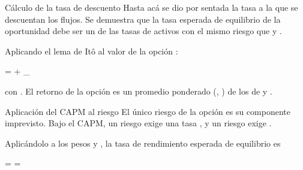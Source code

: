 \begin{frame}{Cálculo de la tasa de descuento}
  Hasta acá se dio por sentada la tasa \az{$\mu$} a la que se descuentan los
  flujos. Se demuestra que la tasa esperada de equilibrio de la oportunidad
  debe ser un  de las tasas de activos con el
  mismo riesgo que  y .
  \par\vspace{2mm}
  Aplicando el lema de Itô al valor de la opción :
  \begin{ecmed}
     = 
      + _{}
  \end{ecmed}
  con .
  El retorno de la opción es un promedio ponderado (\az{$\varepsilon$},
  ) de los de  y .
\end{frame}

\begin{frame}{Aplicación del CAPM al riesgo}
  El único riesgo de la opción es su componente imprevisto. Bajo el CAPM, un
  riesgo  exige una tasa , y un
  riesgo  exige .
  \par\vspace{3mm}
  Aplicándolo a los pesos \az{$\varepsilon$} y , la tasa
  de rendimiento esperada de equilibrio es
  \begin{ec}
    \rj{\mu} = 
      = 
  \end{ec}
\end{frame}

